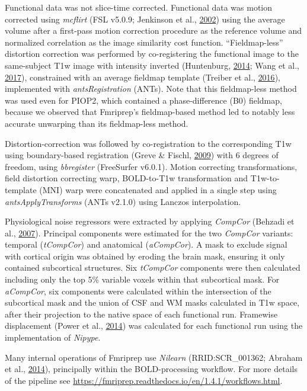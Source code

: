 \documentclass[12pt,american,a4paper,oneside,]{memoir} %
\begin{document}
Functional data was not slice-time corrected. Functional data was motion corrected using \emph{mcflirt} (FSL v5.0.9; Jenkinson et al., \protect\hyperlink{ref-Jenkinson2002-wm}{2002}) using the average volume after a first-pass motion correction procedure as the reference volume and normalized correlation as the image similarity cost function. ``Fieldmap-less'' distortion correction was performed by co-registering the functional image to the same-subject T1w image with intensity inverted (Huntenburg, \protect\hyperlink{ref-Huntenburg2014-ps}{2014}; Wang et al., \protect\hyperlink{ref-Wang2017-nk}{2017}), constrained with an average fieldmap template (Treiber et al., \protect\hyperlink{ref-Treiber2016-mc}{2016}), implemented with \emph{antsRegistration} (ANTs). Note that this fieldmap-less method was used even for PIOP2, which contained a phase-difference (B0) fieldmap, because we observed that Fmriprep's fieldmap-based method led to notably less accurate unwarping than its fieldmap-less method.

Distortion-correction was followed by co-registration to the corresponding T1w using boundary-based registration (Greve \& Fischl, \protect\hyperlink{ref-Greve2009-da}{2009}) with 6 degrees of freedom, using \emph{bbregister} (FreeSurfer v6.0.1). Motion correcting transformations, field distortion correcting warp, BOLD-to-T1w transformation and T1w-to-template (MNI) warp were concatenated and applied in a single step using \emph{antsApplyTransforms} (ANTs v2.1.0) using Lanczos interpolation.

Physiological noise regressors were extracted by applying \emph{CompCor} (Behzadi et al., \protect\hyperlink{ref-Behzadi2007-eb}{2007}). Principal components were estimated for the two \emph{CompCor} variants: temporal (\emph{tCompCor}) and anatomical (\emph{aCompCor}). A mask to exclude signal with cortical origin was obtained by eroding the brain mask, ensuring it only contained subcortical structures. Six \emph{tCompCor} components were then calculated including only the top 5\% variable voxels within that subcortical mask. For \emph{aCompCor}, six components were calculated within the intersection of the subcortical mask and the union of CSF and WM masks calculated in T1w space, after their projection to the native space of each functional run. Framewise displacement (Power et al., \protect\hyperlink{ref-Power2014-gh}{2014}) was calculated for each functional run using the implementation of \emph{Nipype}.

Many internal operations of Fmriprep use \emph{Nilearn} (RRID:SCR\_001362; Abraham et al., \protect\hyperlink{ref-Abraham2014-ef}{2014}), principally within the BOLD-processing workflow. For more details of the pipeline see
\url{https://fmriprep.readthedocs.io/en/1.4.1/workflows.html}.
\end{document}
